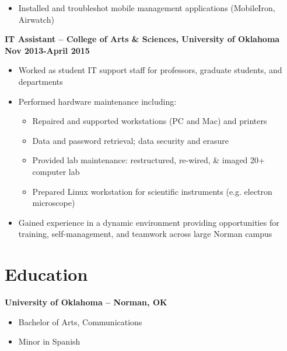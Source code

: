 \documentclass[line]{res}
\begin{document}
\begin{resume}
\begin{itemize}
		\item Installed and troubleshot mobile management applications (MobileIron, Airwatch)
	\end{itemize}
\textbf{IT Assistant -- College of Arts \& Sciences, University of Oklahoma}
\newline
\textbf{Nov 2013-April 2015}
\begin{itemize}
	\item Worked as student IT support staff for professors, graduate students, and departments
	\item Performed hardware maintenance including:
		\begin{itemize}
			\item Repaired and supported workstations (PC and Mac) and printers
			\item Data and password retrieval; data security and erasure
			\item Provided lab maintenance: restructured, re-wired, \& imaged 20+ computer lab 
			\item Prepared Linux workstation for scientific instruments (e.g. electron microscope)
		\end{itemize}
	\item Gained experience in a dynamic environment providing opportunities for training, self-management, and teamwork across large Norman campus
\end{itemize}

\section{Education}
\textbf{University of Oklahoma -- Norman, OK}
\begin{itemize}
\item Bachelor of Arts, Communications
\item Minor in Spanish
	\end{itemize}



\end{resume}
\end{document}
